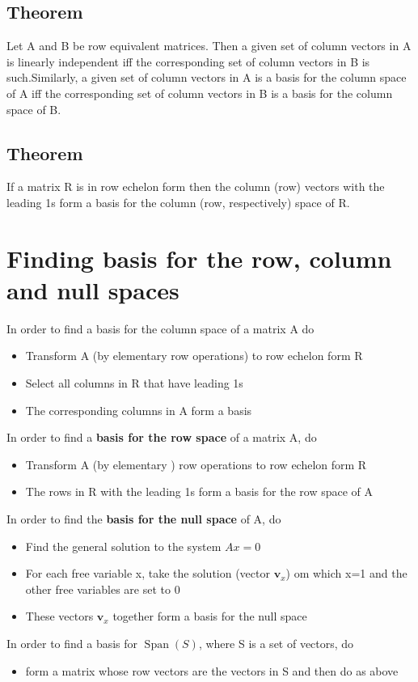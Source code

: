 \documentclass{article}[18pt]
\begin{document}
\subsection{Theorem}
Let A and B be row equivalent matrices.  Then a given set of column vectors in A is linearly independent iff the corresponding set of column vectors in B is such.Similarly, a given set of column vectors in A is a basis for the column space of A iff the corresponding set of column vectors in B is a basis for the column space of B.
\subsection{Theorem}
If a matrix R is in row echelon form then the column (row) vectors with the leading 1s form a basis for the column (row, respectively) space of R.
\section{Finding basis for the row, column and null spaces}
In order to find a basis for the column space of a matrix A do
\begin{itemize}
	\item Transform A (by elementary row operations) to row echelon form R
	\item Select all columns in R that have leading 1s
	\item The corresponding columns in A form a basis
\end{itemize}
In order to find a \textbf{basis for the row space} of a matrix A, do
\begin{itemize}
	\item Transform A (by elementary ) row operations to row echelon form R
	\item The rows in R with the leading 1s form a basis for the row space of A
\end{itemize}
In order to find the \textbf{basis for the null space} of A, do
\begin{itemize}
	\item Find the general solution to the system $Ax=0$
	\item For each free variable x, take the solution (vector $\mathbf{ v }_x$) om which x=1 and the other free variables are set to 0
	\item These vectors $\mathbf{ v }_x$ together form a basis for the null space
\end{itemize}
In order to find a basis for $\operatorname{Span}(S)$, where S is a set of vectors, do
\begin{itemize}
	\item form a matrix whose row vectors are the vectors in S and then do as above
\end{itemize}
\end{document}
